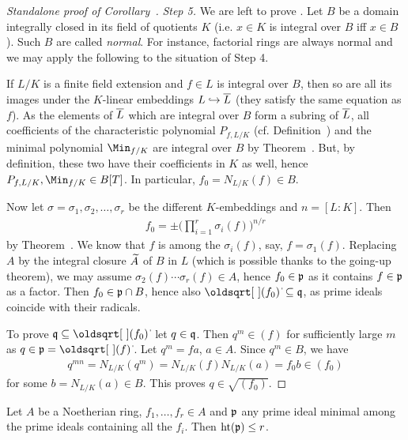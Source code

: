 \documentclass[a4paper,parskip=half,numbers=enddot, DIV=12]{scrreprt}
\begin{document}
\begin{proof}[Standalone proof of Corollary~]
	\emph{Step 5.} We are left to prove . Let $B$ be a domain integrally closed in its field of quotients $K$ (i.e. $x\in K$ is integral over $B$ iff $x\in B$). Such $B$ are called \emph{normal}. For instance, factorial rings are always normal and we may apply the following to the situation of Step 4. 
	
	If $L/K$ is a finite field extension and $f\in L$ is integral over $B$, then so are all its images under the $K$-linear embeddings $L\hookrightarrow \overline L$ (they satisfy the same equation as $f$). As the elements of $\overline L$ which are integral over $B$ form a subring of $\overline L$, all coefficients of the characteristic polynomial $P_{f,L/K}$ (cf. Definition~) and the minimal polynomial $\Min_{f/K}$ are integral over $B$ by Theorem~. But, by definition, these two have their coefficients in $K$ as well, hence $P_{f,L/K},\Min_{f/K}\in B[T]$. In particular, $f_0=N_{L/K}(f)\in B$.
	
	Now let $\sigma=\sigma_1,\sigma_2,\ldots,\sigma_r$ be the different $K$-embeddings and $n=[L:K]$. Then 
	\begin{align*}
		f_0=\pm \bigg(\prod_{i=1}^{r}\sigma_i(f)\bigg)^{n/r}
	\end{align*}
	by Theorem~. We know that $f$ is among the $\sigma_i(f)$, say, $f=\sigma_1(f)$. Replacing $A$ by the integral closure $\snake A$ of $B$ in $L$ (which is possible thanks to the going-up theorem), we may assume $\sigma_2(f)\cdots\sigma_r(f)\in A$, hence $f_0\in \mathfrak{p}$ as it contains $f\in\mathfrak{p}$ as a factor. Then $f_0\in\mathfrak{p}\cap B$, hence also $\sqrt{(f_0)}\subseteq\qq$, as prime ideals coincide with their radicals. 
	
	To prove $\qq\subseteq\sqrt{(f_0)}$ let $q\in\mathfrak{q}$. Then $q^m\in (f)$ for sufficiently large $m$ as $q\in\pp=\sqrt{(f)}$. Let $q^m=fa$, $a\in A$. Since $q^m\in B$, we have 
	\begin{align*}
		q^{mn}=N_{L/K}(q^m)=N_{L/K}(f)N_{L/K}(a)=f_0b\in(f_0)
	\end{align*}
	for some $b=N_{L/K}(a)\in B$. This proves $q\in\sqrt{(f_0)}$.
\end{proof}
\begin{thm}
    Let $A$ be a Noetherian ring, $f_1,\ldots,f_r\in A$ and $\mathfrak{p}$ any prime ideal minimal among the prime ideals containing all the $f_i$. Then $\operatorname{ht}(\mathfrak{p})\leq r$.
\end{thm}    
\end{document}
